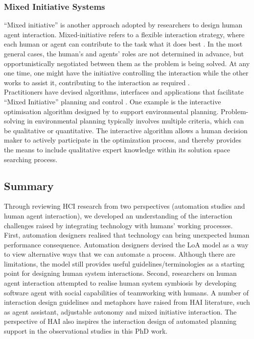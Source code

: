 \subsubsection{Mixed Initiative Systems}
``Mixed initiative'' is another approach adopted by researchers to design human agent interaction.  Mixed-initiative refers to a flexible interaction strategy, where each human or agent can contribute to the task what it does best \citep{Allen1999}. In the most general cases, the human's and agents' roles are not determined in advance, but opportunistically negotiated between them as the problem is being solved. At any one time, one might have the initiative controlling the interaction while the other works to assist it, contributing to the interaction as required \citep{Horvitz1999}.\\

Practitioners have devised algorithms, interfaces and applications that facilitate ``Mixed Initiative'' planning and control \citep{Ferguson1996,Burstein2003,Hardin2009,Zimmerman2007}. One example is the interactive optimisation algorithm designed by \citep{Yang2012} to support environmental planning. Problem-solving in environmental planning typically involves multiple criteria, which can be qualitative or quantitative. The interactive algorithm allows a human decision maker to actively participate in the optimization process, and thereby provides the means to include qualitative expert knowledge within its solution space searching process.\\


\subsection{Summary}
Through reviewing \ac{HCI} research from two perspectives (automation studies and human agent interaction), we developed an understanding of the interaction challenges raised by integrating technology with humans' working processes. First, automation designers realised that technology can bring unexpected human performance consequence. Automation designers devised the \ac{LoA} model as a way to view alternative ways that we can automate a process. Although there are limitations, the model still provides useful guidelines/terminologies as a starting point for designing human system interactions. Second, researchers on human agent interaction attempted to realise human system symbiosis by developing software agent with social capabilities of teamworking with humans. A number of interaction design guidelines and metaphors have raised from \ac{HAI} literature, such as agent assistant, adjustable autonomy and mixed initiative interaction. The perspective of \ac{HAI} also inspires the interaction design of automated planning support in the observational studies in this PhD work.\\ 

